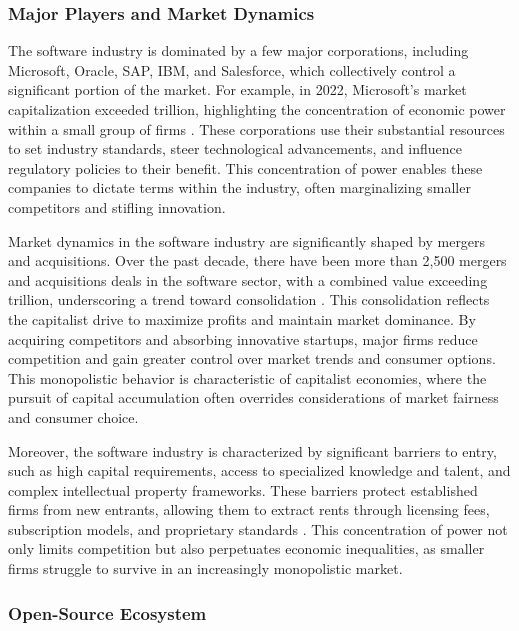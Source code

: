 \begin{refsection}
\subsubsection{Major Players and Market Dynamics}

The software industry is dominated by a few major corporations, including Microsoft, Oracle, SAP, IBM, and Salesforce, which collectively control a significant portion of the market. For example, in 2022, Microsoft's market capitalization exceeded  trillion, highlighting the concentration of economic power within a small group of firms \cite[pp.~143-145]{stucke2016bigdata}. These corporations use their substantial resources to set industry standards, steer technological advancements, and influence regulatory policies to their benefit. This concentration of power enables these companies to dictate terms within the industry, often marginalizing smaller competitors and stifling innovation.

Market dynamics in the software industry are significantly shaped by mergers and acquisitions. Over the past decade, there have been more than 2,500 mergers and acquisitions deals in the software sector, with a combined value exceeding  trillion, underscoring a trend toward consolidation \cite[pp.~143-145]{stucke2016bigdata}. This consolidation reflects the capitalist drive to maximize profits and maintain market dominance. By acquiring competitors and absorbing innovative startups, major firms reduce competition and gain greater control over market trends and consumer options. This monopolistic behavior is characteristic of capitalist economies, where the pursuit of capital accumulation often overrides considerations of market fairness and consumer choice.

Moreover, the software industry is characterized by significant barriers to entry, such as high capital requirements, access to specialized knowledge and talent, and complex intellectual property frameworks. These barriers protect established firms from new entrants, allowing them to extract rents through licensing fees, subscription models, and proprietary standards \cite[pp.~31-33]{cusumano2002platform}. This concentration of power not only limits competition but also perpetuates economic inequalities, as smaller firms struggle to survive in an increasingly monopolistic market.

\subsubsection{Open-Source Ecosystem}


\end{refsection}
